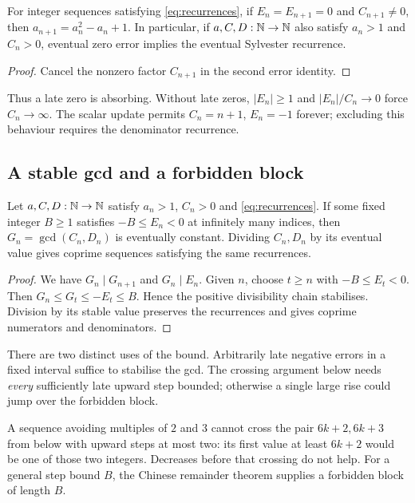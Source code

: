 \documentclass[11pt]{article}
\begin{document}
\begin{corollary}\label{res:step}\label{res:eventual}
For integer sequences satisfying \eqref{eq:recurrences}, if
$E_n=E_{n+1}=0$ and $C_{n+1}\ne0$, then
$a_{n+1}=a_n^2-a_n+1$. In particular, if $a,C,D:\mathbb{N}\to\mathbb{N}$
also satisfy $a_n>1$ and $C_n>0$, eventual zero error implies
the eventual Sylvester recurrence.
\end{corollary}
\begin{proof}
Cancel the nonzero factor $C_{n+1}$ in the second error identity.
\end{proof}

Thus a late zero is absorbing. Without late zeros, $|E_n|\ge1$ and
$|E_n|/C_n\to0$ force $C_n\to\infty$. The scalar update permits
$C_n=n+1$, $E_n=-1$ forever; excluding this behaviour requires the
denominator recurrence.

\subsection{A stable gcd and a forbidden block}\label{sec:barrier}
\begin{proposition}\label{res:gcdstab}
Let $a,C,D:\mathbb{N}\to\mathbb{N}$ satisfy $a_n>1$, $C_n>0$ and
\eqref{eq:recurrences}. If some fixed integer $B\ge1$ satisfies
$-B\le E_n<0$ at infinitely many indices, then
$G_n=\gcd(C_n,D_n)$ is eventually constant. Dividing $C_n,D_n$ by
its eventual value gives coprime sequences satisfying the same recurrences.
\end{proposition}
\begin{proof}
We have $G_n\mid G_{n+1}$ and $G_n\mid E_n$. Given $n$, choose $t\ge n$
with $-B\le E_t<0$. Then $G_n\le G_t\le -E_t\le B$.
Hence the positive divisibility chain stabilises. Division by its
stable value preserves the recurrences and gives coprime numerators and denominators.
\end{proof}
There are two distinct uses of the bound. Arbitrarily late negative
errors in a fixed interval suffice to stabilise the gcd. The crossing
argument below needs \emph{every} sufficiently late upward step bounded;
otherwise a single large rise could jump over the forbidden block.

A sequence avoiding multiples of $2$ and $3$ cannot cross the pair
$6k+2,6k+3$ from below with upward steps at most two: its first value
at least $6k+2$ would be one of those two integers. Decreases before
that crossing do not help. For a general step bound $B$, the Chinese
remainder theorem supplies a forbidden block of length $B$.
\end{document}
